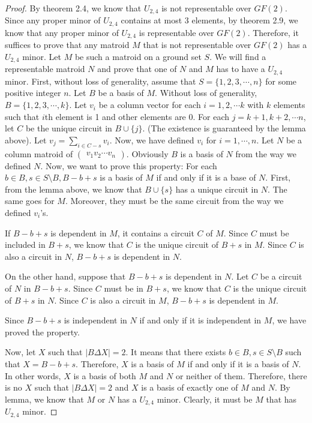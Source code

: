 \begin{proof}
By theorem 2.4, we know that $U_{2, 4}$ is not representable over $GF(2)$.
Since any proper minor of $U_{2, 4}$ contains at most 3 elements, by theorem 2.9, we know that any proper minor of $U_{2, 4}$ is representable over $GF(2)$.
Therefore, it suffices to prove that any matroid $M$ that is not representable over $GF(2)$ has a $U_{2, 4}$ minor.
Let $M$ be such a matroid on a ground set $S$.
We will find a representable matroid $N$ and prove that one of $N$ and $M$ has to have a $U_{2, 4}$ minor.
First, without loss of generality, assume that $S = \{1, 2, 3, \cdots, n\}$ for some positive integer $n$.
Let $B$ be a basis of $M$.
Without loss of generality, $B = \{1, 2, 3, \cdots, k\}$.
Let $v_i$ be a column vector for each $i = 1, 2, \cdots k$ with $k$ elements such that $i$th element is 1 and other elements are 0.
For each $j = k + 1, k + 2, \cdots n$, let $C$ be the unique circuit in $B \cup \{ j \}$. 
(The existence is guaranteed by the lemma above).
Let $\displaystyle v_j = \sum_{i \in C - s } v_i$.
Now, we have defined $v_i$ for $i = 1, \cdots, n$.
Let $N$ be a column matroid of $\begin{pmatrix} v_1 v_2 \cdots v_n \end{pmatrix}$.
Obviously $B$ is a basis of $N$ from the way we defined $N$.
Now, we want to prove this property: For each $b \in B, s \in S \setminus B, B - b + s$ is a basis of $M$ if and only if it is a base of $N$.
First, from the lemma above, we know that $B \cup \{ s \}$ has a unique circuit in $N$.
The same goes for $M$.
Moreover, they must be the same circuit from the way we defined $v_i$'s.

If $B - b + s$ is dependent in $M$, it contains a circuit $C$ of $M$.
Since $C$ must be included in $B + s$, we know that $C$ is the unique circuit of $B + s$ in $M$.
Since $C$ is also a circuit in $N$, $B - b + s$ is dependent in $N$.

On the other hand, suppose that $B - b + s$ is dependent in $N$.
Let $C$ be a circuit of $N$ in $B - b + s$.
Since $C$ must be in $B + s$, we know that $C$ is the unique circuit of $B + s$ in $N$.
Since $C$ is also a circuit in $M$, $B - b + s$ is dependent in $M$.

Since $B - b + s$ is independent in $N$ if and only if it is independent in $M$, we have proved the property.

Now, let $X$ such that $\lvert B \Delta X \rvert = 2$.
It means that there exists $b \in B, s \in S \setminus B$ such that $X = B - b + s$.
Therefore, $X$ is a basis of $M$ if and only if it is a basis of $N$.
In other words, $X$ is a basis of both $M$ and $N$ or neither of them.
Therefore, there is no $X$ such that $\lvert B \Delta X \rvert = 2$ and $X$ is a basis of exactly one of $M$ and $N$.
By lemma, we know that $M$ or $N$ has a $U_{2, 4}$ minor.
Clearly, it must be $M$ that has $U_{2, 4}$ minor.
\end{proof}

